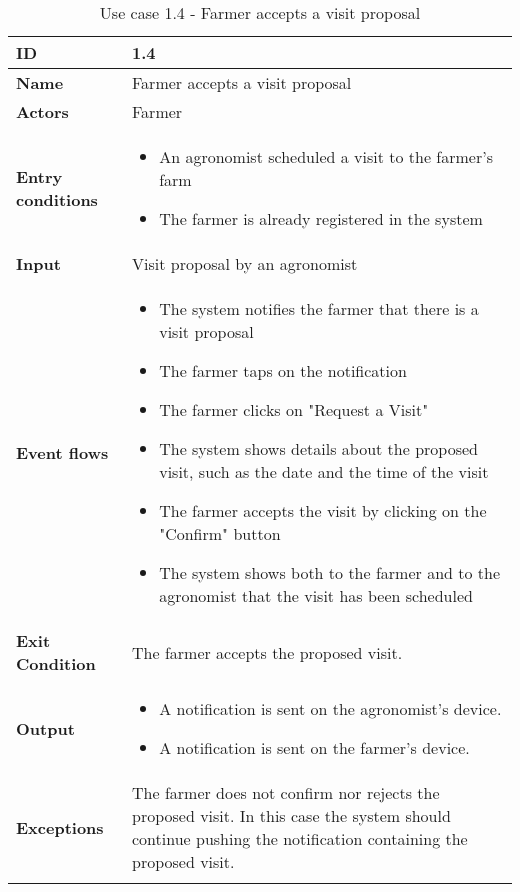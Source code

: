 \begin{longtable}[H]{ | l | p{10cm} | }
\hline
{\cellcolor[rgb]{0.753,0.753,0.753}}\textbf{ID}  & 1.4 \\ \hline
{\cellcolor[rgb]{0.753,0.753,0.753}}\textbf{Name} & Farmer accepts a visit proposal \\ \hline
{\cellcolor[rgb]{0.753,0.753,0.753}}\textbf{Actors} & Farmer \\ \hline
{\cellcolor[rgb]{0.753,0.753,0.753}}\textbf{Entry conditions} &
\begin{itemize}
    \item An agronomist scheduled a visit to the farmer's farm
    \item The farmer is already registered in the system
\end{itemize}
\\ \hline
{\cellcolor[rgb]{0.753,0.753,0.753}}\textbf{Input} & Visit proposal by an agronomist\\ \hline
{\cellcolor[rgb]{0.753,0.753,0.753}}\textbf{Event flows} &
\begin{itemize}
    \item The system notifies the farmer that there is a visit proposal
    \item The farmer taps on the notification
    \item The farmer clicks on "Request a Visit"
    \item The system shows details about the proposed visit, such as the date and the time of the visit
    \item The farmer accepts the visit by clicking on the "Confirm" button
    \item The system shows both to the farmer and to the agronomist that the visit has been scheduled
\end{itemize}
\\ \hline
{\cellcolor[rgb]{0.753,0.753,0.753}}\textbf{Exit Condition} & The farmer accepts the proposed visit.\\ \hline
{\cellcolor[rgb]{0.753,0.753,0.753}}\textbf{Output} & 
\begin{itemize}
    \item A notification is sent on the agronomist's device.
    \item A notification is sent on the farmer's device.
\end{itemize}
\\ \hline
{\cellcolor[rgb]{0.753,0.753,0.753}}\textbf{Exceptions} & The farmer does not confirm nor rejects the proposed visit. In this case the system should continue pushing the notification containing the proposed visit.
\\ \hline
\caption{Use case 1.4 - Farmer accepts a visit proposal}
\\
\end{longtable}
